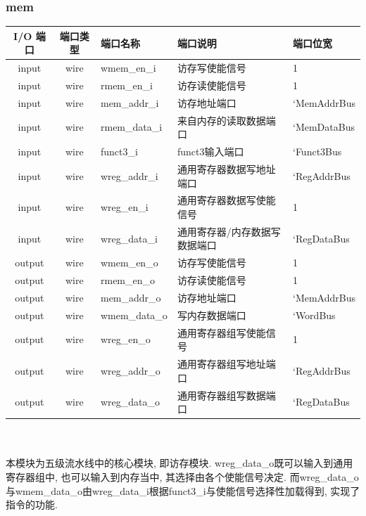 \documentclass[lang=cn,11pt,a4paper,chinesefont=founder]{elegantpaper}
\begin{document}
\subsubsection{mem}
\begin{tabular}{cclll}
    \toprule
    I/O 端口 & 端口类型 & 端口名称      & 端口说明                      & 端口位宽    \\
    \midrule
    input    & wire     & wmem\_en\_i   & 访存写使能信号                & 1           \\
    input    & wire     & rmem\_en\_i   & 访存读使能信号                & 1           \\
    input    & wire     & mem\_addr\_i  & 访存地址端口                  & `MemAddrBus \\
    input    & wire     & rmem\_data\_i & 来自内存的读取数据端口        & `MemDataBus \\
    input    & wire     & funct3\_i     & funct3输入端口                & `Funct3Bus  \\
    input    & wire     & wreg\_addr\_i & 通用寄存器数据写地址端口      & `RegAddrBus \\
    input    & wire     & wreg\_en\_i   & 通用寄存器数据写使能信号      & 1           \\
    input    & wire     & wreg\_data\_i & 通用寄存器/内存数据写数据端口 & `RegDataBus \\

    output   & wire     & wmem\_en\_o   & 访存写使能信号                & 1           \\
    output   & wire     & rmem\_en\_o   & 访存读使能信号                & 1           \\
    output   & wire     & mem\_addr\_o  & 访存地址端口                  & `MemAddrBus \\
    output   & wire     & wmem\_data\_o & 写内存数据端口                & `WordBus    \\
    output   & wire     & wreg\_en\_o   & 通用寄存器组写使能信号        & 1           \\
    output   & wire     & wreg\_addr\_o & 通用寄存器组写地址端口        & `RegAddrBus \\
    output   & wire     & wreg\_data\_o & 通用寄存器组写数据端口        & `RegDataBus \\
    \bottomrule
\end{tabular}\\
\\
本模块为五级流水线中的核心模块, 即访存模块. wreg\_data\_o既可以输入到通用寄存器组中, 也可以输入到内存当中, 其选择由各个使能信号决定. 而wreg\_data\_o与wmem\_data\_o由wreg\_data\_i根据funct3\_i与使能信号选择性加载得到, 实现了指令的功能. 
\end{document}
